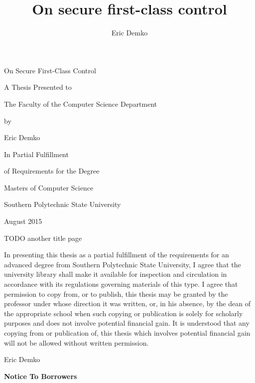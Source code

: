 \documentclass[11pt]{article}
\title{On secure first-class control}
\author{Eric Demko}
\begin{document}
\thispagestyle{empty}
\vskip 3.167in

\begin{center}
{\LARGE On Secure First-Class Control}
\end{center}

\vskip 2in

\begin{center}
A Thesis Presented to\par
The Faculty of the Computer Science Department
\end{center}

\vskip 0.33in
\begin{center}by\end{center}
\vskip 0.167in
\begin{center}Eric Demko\end{center}
\vskip 0.33in

\begin{center}
In Partial Fulfillment\par
of Requirements for the Degree\par
Masters of Computer Science
\end{center}

\vskip 1in

\begin{center}
Southern Polytechnic State University

August 2015
\end{center}


\newpage{}
TODO another title page

\newpage
In presenting this thesis as a partial fulfillment of the requirements for an advanced degree from Southern Polytechnic State University, I agree that the university library shall make it available for inspection and circulation in accordance with its regulations governing materials of this type. I agree that permission to copy from, or to publish, this thesis may be granted by the professor under whose direction it was written, or, in his absence, by the dean of the appropriate school when such copying or publication is solely for scholarly purposes and does not involve potential financial gain. It is understood that any copying from or publication of, this thesis which involves potential financial gain will not be allowed without written permission.

\hskip 3in Eric Demko

\newpage

\begin{center}\textbf{Notice To Borrowers}\end{center}
\end{document}
